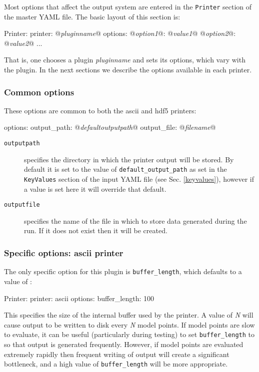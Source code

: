 \documentclass[pdftex,twocolumn,epjc3_preprint,runningheads]{svjour3}
\makeatletter
\renewcommand{\_}{\discretionary{\underscore}{}{\underscore}}
\newcommand\yaml[1]{{\lstset{style=yaml}\lstinline!#1!\lstset{style=cpp}}}
\newcommand\yamlvalue[1]{{\YAMLvaluestyle\ttfamily#1}}
\newcommand\YAMLkeystyle{\footnotesize\color{solarized@blue}\ttfamily}
\newcommand\YAMLvaluestyle{\footnotesize\color{blue}\mdseries}
\newcommand{\metavarf}[1]{\textit{\color{darkgreen}\footnotesize\textrm{#1}}}
\newcommand{\metavar}{\metavarf}
\newcommand\YAML{\textsf{YAML}\xspace}
\makeatother
\begin{document}
Most options that affect the output system are entered in the \yaml{Printer} section of the master \YAML file. The basic layout of this section is:
\begin{lstyaml}
Printer:
  printer: @\metavar{plugin\_name}@
  options:
    @\metavar{option\_1}@: @\metavar{value\_1}@
    @\metavar{option\_2}@: @\metavar{value\_2}@
    ...
\end{lstyaml}
That is, one chooses a plugin \metavar{plugin\_name} and sets its options, which vary with the plugin. In the next sections we describe the options available in each printer.

\subsubsection{Common options}
\label{common_printer_setup}
These options are common to both the \textsf{ascii} and \textsf{hdf5} printers:
\begin{lstyaml}
  options:
    output_path: @\metavar{default\_output\_path}@
    output_file: @\metavar{filename}@
\end{lstyaml}

\begin{description}
\item[\YAMLkeystyle \texttt{output\_path}] specifies the directory in which the printer output will be stored. By default it is set to the value of \yaml{default_output_path} as set in the \yaml{KeyValues} section of the input \YAML file (see Sec. \ref{keyvalues}), however if a value is set here it will override that default.
\item[\YAMLkeystyle \texttt{output\_file}] specifies the name of the file in which to store data generated during the run. If it does not exist then it will be created.
\end{description}

\subsubsection{Specific options: \textsf{ascii} printer}
\label{ascii_printer_setup}
The only specific option for this plugin is \yaml{buffer_length}, which defaults to a value of \yamlvalue{100}:
\begin{lstyaml}
Printer:
  printer: ascii
  options:
    buffer_length: 100
\end{lstyaml}
This specifies the size of the internal buffer used by the printer. A value of \metavar{N} will cause output to be written to disk every \metavar{N} model points.  If model points are slow to evaluate, it can be useful (particularly during testing) to set \yaml{buffer_length} to \yamlvalue{1} so that output is generated frequently. However, if model points are evaluated extremely rapidly then frequent writing of output will create a significant bottleneck, and a high value of \yaml{buffer_length} will be more appropriate.
\end{document}
